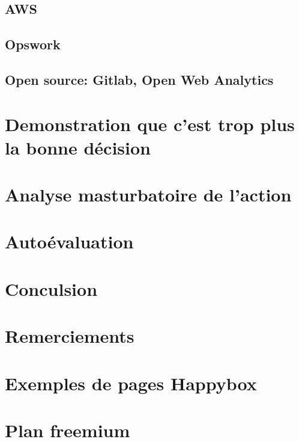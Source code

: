 \documentclass[11pt, a4paper ]{article}
\let\stdsection\section
\renewcommand\section{\newpage\stdsection}
\begin{document}
			\subsection{AWS}

			\subsection{Opswork}

			\subsection{Open source: Gitlab, Open Web Analytics}

		\section{Demonstration que c'est trop plus la bonne décision} %

		\section{Analyse masturbatoire de l'action} %

		\section{Autoévaluation}

	\section{Conculsion} %

	\section{Remerciements}

	\appendix
	\section{Exemples de pages Happybox}

	\section{Plan freemium}
	\printindex

	
	
\end{document}
